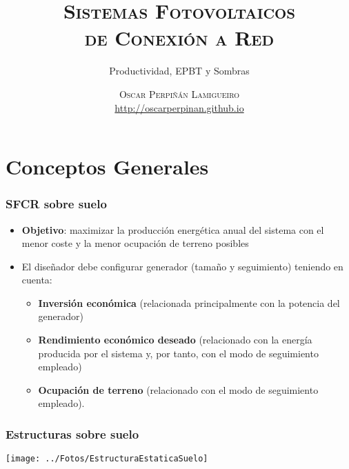 \documentclass[xcolor=dvipsnames]{beamer}
\begin{document}
\title{\textsc{Sistemas Fotovoltaicos }\\%
  \textsc{de Conexión a Red}}


\subtitle{Productividad, EPBT y Sombras}




\date{}


\author{\textsc{Oscar Perpiñán Lamigueiro}\\%
  \url{http://oscarperpinan.github.io}}


\begin{frame}[plain]
  \titlepage
\end{frame}


%

\section{Conceptos Generales}


\begin{frame}
\frametitle{SFCR sobre suelo}
\begin{itemize}
\item \textbf{Objetivo}: maximizar la producción energética anual del sistema
con el menor coste y la menor ocupación de terreno posibles
\item El diseñador debe configurar generador (tamaño y seguimiento) teniendo
en cuenta:

\begin{itemize}
\item \textbf{Inversión económica} (relacionada principalmente con la potencia
del generador)
\item \textbf{Rendimiento económico deseado} (relacionado con la energía
producida por el sistema y, por tanto, con el modo de seguimiento
empleado) 
\item \textbf{Ocupación de terreno} (relacionado con el modo de seguimiento
empleado).
\end{itemize}
\end{itemize}

\end{frame}

\begin{frame}[plain]
\frametitle{Estructuras sobre suelo}

\begin{center}
\texttt{[image: ../Fotos/EstructuraEstaticaSuelo]}
\par\end{center}


\end{frame}
\end{document}
